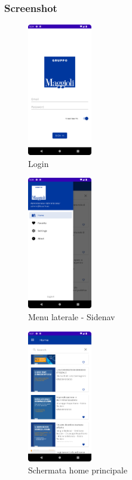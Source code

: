 \subsubsection*{Screenshot}
\begin{multicols}{3}
            \begin{figure}[H]
                \centering
                \includegraphics[width=0.25\textwidth]{img/login.png}
                \caption{Login}
                \label{login-android}
            \end{figure}

            \begin{figure}[H]
                \centering
                \includegraphics[width=0.25\textwidth]{img/sidenav.png}
                \caption{Menu laterale - Sidenav}
                \label{sidenav-android}
            \end{figure}
            
            \begin{figure}[H]
                \centering
                \includegraphics[width=0.25\textwidth]{img/home.png}
                \caption{Schermata home principale}
                \label{home-android}
            \end{figure}
            

\end{multicols}
